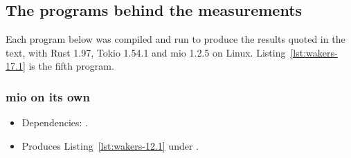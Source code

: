 
\subsection{The programs behind the measurements}
\label{sec:wakers-programs}

Each program below was compiled and run to produce the results quoted in the text, with Rust 1.97, Tokio 1.54.1 and mio 1.2.5 on Linux. Listing~\ref{lst:wakers-17.1} is the fifth program.

\subsubsection{mio on its own}

\begin{itemize}
    \item Dependencies: .
    \item Produces Listing~\ref{lst:wakers-12.1} under .
\end{itemize}


